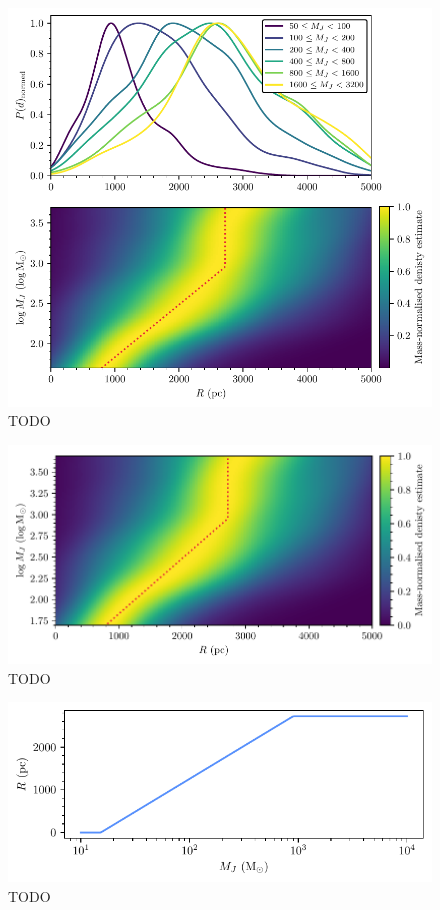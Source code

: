 \begin{figure}[t]
    \centering
    \includegraphics[width=\textwidth]{fig/c4/discussion_completeness.pdf}
    \caption[TODO]{TODO}
    \label{fig:dynamics:discussion:completeness}
\end{figure}

\begin{figure}[t]
    \centering
    \includegraphics[width=\textwidth]{fig/c4/discussion_completeness_kde.pdf}
    \caption[TODO]{TODO}
    \label{fig:dynamics:discussion:completeness_kde}
\end{figure}

\begin{figure}[t]
    \centering
    \includegraphics[width=\textwidth]{fig/c4/discussion_completeness_function.pdf}
    \caption[TODO]{TODO}
    \label{fig:dynamics:discussion:completeness_function}
\end{figure}


